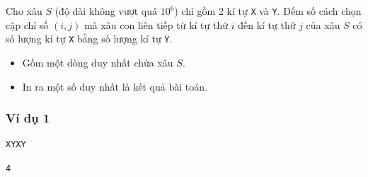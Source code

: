 
Cho xâu $S$ (độ dài không vượt quá $10^{6}$) chỉ gồm 2 kí tự \texttt{X} và \texttt{Y}. Đếm số cách chọn cặp chỉ số $(i,j)$ mà xâu con liên tiếp từ kí tự thứ $i$ đến kí tự thứ $j$ của xâu $S$ có số lượng kí tự \texttt{X} bằng số lượng kí tự \texttt{Y}. 

\begin{itemize}
    \item Gồm một dòng duy nhất chứa xâu $S$.
\end{itemize}

\begin{itemize}
    \item In ra một số duy nhất là kết quả bài toán.
\end{itemize}


\subsubsection*{Ví dụ 1}
\begin{makesample}
\begin{lstlisting}
XYXY
\end{lstlisting}
\nextsample
\begin{lstlisting}
4
\end{lstlisting}
\end{makesample}
